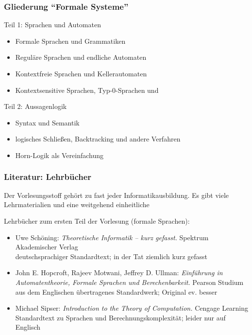 \documentclass[onlymath]{beamer}
\begin{document}
\begin{frame}\frametitle{Gliederung "`Formale Systeme"'}

\alert{Teil 1: Sprachen und Automaten}
\begin{itemize}
\item Formale Sprachen und Grammatiken
\item Reguläre Sprachen und endliche Automaten
\item Kontextfreie Sprachen und Kellerautomaten
\item Kontextsensitive Sprachen, Typ-0-Sprachen und 
\end{itemize}
\bigskip

\alert{Teil 2: Aussagenlogik}
\begin{itemize}
\item Syntax und Semantik
\item logisches Schließen, Backtracking und andere Verfahren
\item Horn-Logik als Vereinfachung
\end{itemize}

\end{frame}


\begin{frame}\frametitle{Literatur: Lehrbücher}

Der Vorlesungsstoff gehört zu fast jeder Informatikausbildung. Es gibt viele
Lehrmaterialien und eine weitgehend einheitliche 
\bigskip

Lehrbücher zum ersten Teil der Vorlesung (formale Sprachen):

\begin{itemize}
\item Uwe Schöning: \emph{Theoretische Informatik -- kurz gefasst.} Spektrum Akademischer Verlag\\
{\footnotesize\textcolor{devilscss}{deutschsprachiger Standardtext; in der Tat ziemlich kurz gefasst}}
%
\item John E. Hopcroft, Rajeev Motwani, Jeffrey D. Ullman: \emph{Einführung in Automatentheorie, Formale Sprachen und Berechenbarkeit.} Pearson Studium\\
{\footnotesize\textcolor{devilscss}{aus dem Englischen übertragenes Standardwerk; Original ev. besser}}
%
\item Michael Sipser: \emph{Introduction to the Theory of Computation.}  Cengage Learning\\
{\footnotesize\textcolor{devilscss}{Standardtext zu Sprachen und Berechnungskomplexität; leider nur auf Englisch}}
\end{itemize}

\end{frame}
\end{document}
